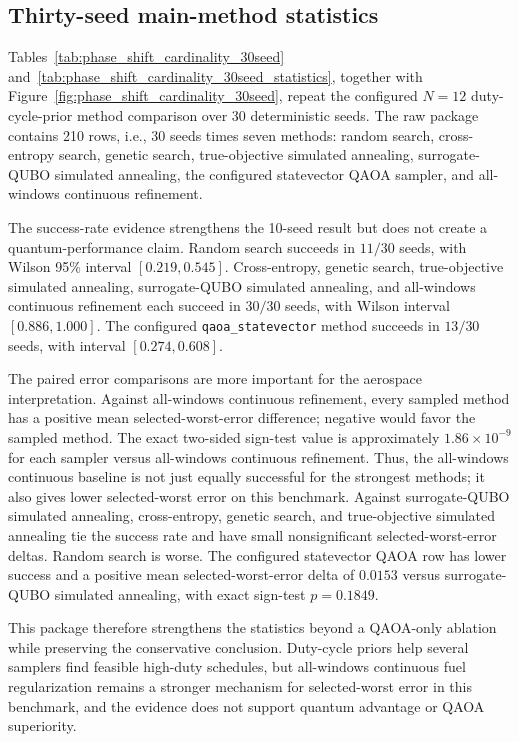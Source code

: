 \documentclass[preprint,12pt]{elsarticle}
\begin{document}
\subsection{Thirty-seed main-method statistics}

Tables~\ref{tab:phase_shift_cardinality_30seed} and~\ref{tab:phase_shift_cardinality_30seed_statistics}, together with Figure~\ref{fig:phase_shift_cardinality_30seed}, repeat the configured $N=12$ duty-cycle-prior method comparison over 30 deterministic seeds. The raw package contains 210 rows, i.e., 30 seeds times seven methods: random search, cross-entropy search, genetic search, true-objective simulated annealing, surrogate-QUBO simulated annealing, the configured statevector QAOA sampler, and all-windows continuous refinement.

The success-rate evidence strengthens the 10-seed result but does not create a quantum-performance claim. Random search succeeds in $11/30$ seeds, with Wilson 95\% interval $[0.219,0.545]$. Cross-entropy, genetic search, true-objective simulated annealing, surrogate-QUBO simulated annealing, and all-windows continuous refinement each succeed in $30/30$ seeds, with Wilson interval $[0.886,1.000]$. The configured \texttt{qaoa\_statevector} method succeeds in $13/30$ seeds, with interval $[0.274,0.608]$.

The paired error comparisons are more important for the aerospace interpretation. Against all-windows continuous refinement, every sampled method has a positive mean selected-worst-error difference; negative would favor the sampled method. The exact two-sided sign-test value is approximately $1.86\times10^{-9}$ for each sampler versus all-windows continuous refinement. Thus, the all-windows continuous baseline is not just equally successful for the strongest methods; it also gives lower selected-worst error on this benchmark. Against surrogate-QUBO simulated annealing, cross-entropy, genetic search, and true-objective simulated annealing tie the success rate and have small nonsignificant selected-worst-error deltas. Random search is worse. The configured statevector QAOA row has lower success and a positive mean selected-worst-error delta of $0.0153$ versus surrogate-QUBO simulated annealing, with exact sign-test $p=0.1849$.

This package therefore strengthens the statistics beyond a QAOA-only ablation while preserving the conservative conclusion. Duty-cycle priors help several samplers find feasible high-duty schedules, but all-windows continuous fuel regularization remains a stronger mechanism for selected-worst error in this benchmark, and the evidence does not support quantum advantage or QAOA superiority.
\end{document}
